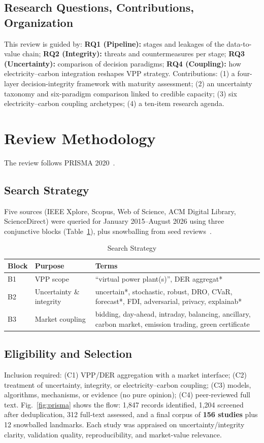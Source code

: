 \documentclass[journal]{IEEEtran}
\begin{document}
\subsection{Research Questions, Contributions, Organization}
This review is guided by: \textbf{RQ1 (Pipeline):} stages and leakages of the data-to-value chain; \textbf{RQ2 (Integrity):} threats and countermeasures per stage; \textbf{RQ3 (Uncertainty):} comparison of decision paradigms; \textbf{RQ4 (Coupling):} how electricity--carbon integration reshapes VPP strategy. Contributions: (1) a four-layer decision-integrity framework with maturity assessment; (2) an uncertainty taxonomy and six-paradigm comparison linked to credible capacity; (3) six electricity--carbon coupling archetypes; (4) a ten-item research agenda.

\section{Review Methodology}
The review follows PRISMA 2020~\cite{prisma2020}.
\subsection{Search Strategy}
Five sources (IEEE Xplore, Scopus, Web of Science, ACM Digital Library, ScienceDirect) were queried for January 2015--August 2026 using three conjunctive blocks (Table~\ref{tab:search}), plus snowballing from seed reviews~\cite{naval2021,zare2026,xiao2025,sousa2019,andoni2019,hong2016}.

\begin{table}[htbp]
\caption{Search Strategy}
\label{tab:search}
\centering
\begin{tabular}{p{1.4cm}p{3.4cm}p{3.2cm}}
\toprule
\textbf{Block} & \textbf{Purpose} & \textbf{Terms} \\
\midrule
B1 & VPP scope & ``virtual power plant(s)'', DER aggregat* \\
B2 & Uncertainty \& integrity & uncertain*, stochastic, robust, DRO, CVaR, forecast*, FDI, adversarial, privacy, explainab* \\
B3 & Market coupling & bidding, day-ahead, intraday, balancing, ancillary, carbon market, emission trading, green certificate \\
\bottomrule
\end{tabular}
\end{table}

\subsection{Eligibility and Selection}
Inclusion required: (C1) VPP/DER aggregation with a market interface; (C2) treatment of uncertainty, integrity, or electricity--carbon coupling; (C3) models, algorithms, mechanisms, or evidence (no pure opinion); (C4) peer-reviewed full text. Fig.~\ref{fig:prisma} shows the flow: 1,847 records identified, 1,204 screened after deduplication, 312 full-text assessed, and a final corpus of \textbf{156 studies} plus 12 snowballed landmarks. Each study was appraised on uncertainty/integrity clarity, validation quality, reproducibility, and market-value relevance.
\end{document}

